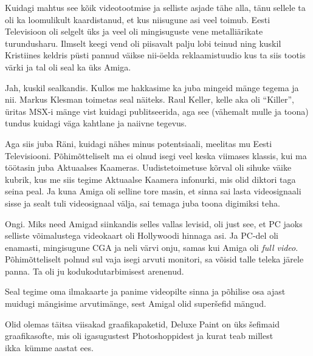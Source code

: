 Kuidagi mahtus see kõik videotootmise ja selliste asjade tähe alla, tänu 
sellele ta oli ka loomulikult kaardistanud, et kus niisugune asi veel toimub. 
Eesti Televisioon oli selgelt 
üks ja veel oli mingisuguste vene metalliärikate turundusharu. Ilmselt keegi 
vend oli piisavalt palju lobi teinud ning kuskil Kristiines  keldris püsti 
pannud väikse nii-öelda reklaamistuudio kus ta siis tootis värki ja tal oli 
seal ka üks Amiga. 


Jah, kuskil sealkandis. Kullos me hakkasime ka juba mingeid mänge tegema ja 
nii. Markus Klesman toimetas seal näiteks. Raul 
Keller, kelle aka oli 
\enquote{Killer}, üritas MSX-i mänge vist 
kuidagi publitseerida, aga see (vähemalt mulle ja toona) tundus kuidagi väga 
kahtlane ja naiivne tegevus.

Aga siis juba Räni, kuidagi nähes minus potentsiaali, 
meelitas mu Eesti Televisiooni. Põhimõtteliselt ma ei olnud isegi veel keska viimases klassis, 
kui ma töötasin juba Aktuaalses Kaameras. Uudistetoimetuse kõrval oli sihuke 
väike kubrik, kus me siis tegime Aktuaalse Kaamera infonurki, mis olid  diktori 
taga seina peal. Ja kuna Amiga oli selline tore masin, et  
sinna sai lasta videosignaali sisse ja sealt tuli videosignaal välja, sai 
temaga juba toona digimiksi teha. 


Ongi. Miks need Amigad siinkandis selles vallas levisid, oli just see, et PC 
jaoks selliste võimalustega videokaart oli Hollywoodi hinnaga asi. Ja PC-del 
oli enamasti, mingisugune CGA ja neli värvi onju, samas kui 
Amiga oli \emph{full video}. Põhimõtteliselt polnud sul 
vaja isegi arvuti monitori, sa võisid talle teleka järele panna. Ta oli ju  
kodukodutarbimisest arenenud. 

Seal tegime oma ilmakaarte ja panime videopilte sinna ja põhilise osa ajast 
muidugi mängisime arvutimänge, sest  Amigal olid superšefid mängud. 


Olid olemas täitsa viisakad graafikapaketid, Deluxe Paint on üks šefimaid graafikasofte, mis oli igasugustest 
Photoshoppidest ja kurat teab millest ikka kümme aastat ees. 


